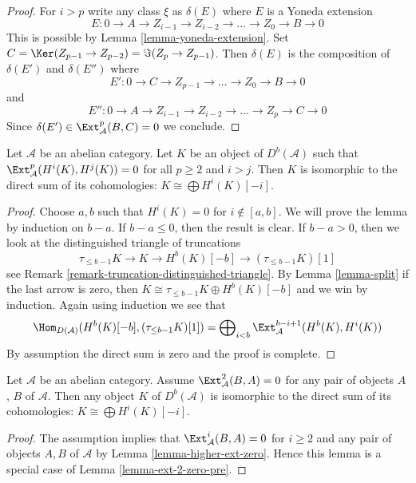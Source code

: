 \begin{proof}
For $i > p$ write any class $\xi$ as $\delta(E)$
where $E$ is a Yoneda extension
$$
E : 0 \to A \to Z_{i - 1} \to Z_{i - 2} \to \ldots \to Z_0 \to B \to 0
$$
This is possible by Lemma \ref{lemma-yoneda-extension}.
Set $C = \Ker(Z_{p - 1} \to Z_{p - 2}) = \Im(Z_p \to Z_{p - 1})$.
Then $\delta(E)$ is the composition of $\delta(E')$ and $\delta(E'')$
where
$$
E' : 0 \to C \to Z_{p - 1} \to \ldots \to Z_0 \to B \to 0
$$
and
$$
E'' : 0 \to A \to Z_{i - 1} \to Z_{i - 2} \to \ldots \to Z_p \to C \to 0
$$
Since $\delta(E') \in \Ext^p_\mathcal{A}(B, C) = 0$
we conclude.
\end{proof}

\begin{lemma}
\label{lemma-ext-2-zero-pre}
Let $\mathcal{A}$ be an abelian category. Let $K$ be an object of
$D^b(\mathcal{A})$ such that $\Ext^p_\mathcal{A}(H^i(K), H^j(K)) = 0$
for all $p \geq 2$ and $i > j$. Then $K$ is isomorphic to the direct
sum of its cohomologies: $K \cong \bigoplus H^i(K)[-i]$.
\end{lemma}

\begin{proof}
Choose $a, b$ such that $H^i(K) = 0$ for $i \not \in [a, b]$.
We will prove the lemma by induction on $b - a$. If $b - a \leq 0$,
then the result is clear. If $b - a > 0$, then we look at the
distinguished triangle of truncations
$$
\tau_{\leq b - 1}K \to K \to H^b(K)[-b] \to (\tau_{\leq b - 1}K)[1]
$$
see Remark \ref{remark-truncation-distinguished-triangle}.
By Lemma \ref{lemma-split} if the last arrow is zero, then
$K \cong \tau_{\leq b - 1}K \oplus H^b(K)[-b]$ and we win
by induction. Again using induction we see that
$$
\Hom_{D(\mathcal{A})}(H^b(K)[-b], (\tau_{\leq b - 1}K)[1]) =
\bigoplus\nolimits_{i < b} \Ext_\mathcal{A}^{b - i + 1}(H^b(K), H^i(K))
$$
By assumption the direct sum is zero and the proof is complete.
\end{proof}

\begin{lemma}
\label{lemma-ext-2-zero}
Let $\mathcal{A}$ be an abelian category. Assume $\Ext^2_\mathcal{A}(B, A) = 0$
for any pair of objects $A$, $B$ of $\mathcal{A}$.
Then any object $K$ of $D^b(\mathcal{A})$ is isomorphic to the direct
sum of its cohomologies: $K \cong \bigoplus H^i(K)[-i]$.
\end{lemma}

\begin{proof}
The assumption implies that $\Ext^i_\mathcal{A}(B, A) = 0$ for $i \geq 2$
and any pair of objects $A, B$ of $\mathcal{A}$ by
Lemma \ref{lemma-higher-ext-zero}. Hence this lemma is a special
case of Lemma \ref{lemma-ext-2-zero-pre}.
\end{proof}






